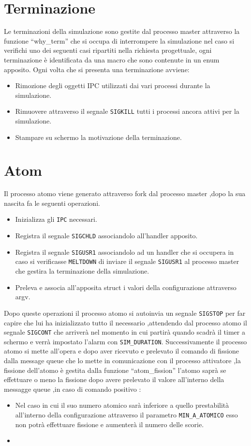 \section{Terminazione} 
Le terminazioni della simulazione sono gestite dal processo master attraverso la funzione \enquote{why\_term} che si occupa di interrompere la simulazione nel caso si verifichi uno dei seguenti casi  ripartiti nella richiesta progettuale, ogni terminazione è identificata da una macro che sono contenute in un enum apposito. 
Ogni volta che si presenta una terminazione avviene:
\begin{itemize}
    \item Rimozione degli oggetti IPC utilizzati dai vari processi durante la simulazione. 
    \item Rimuovere attraverso il segnale \texttt{SIGKILL} tutti i processi ancora attivi per la simulazione. 
    \item Stampare su schermo la motivazione della terminazione. 
\end{itemize}
\section{Atom}

Il processo atomo viene generato attraverso fork dal processo master ,dopo la sua nascita fa le seguenti operazioni.
    \begin{itemize}
        \item Inizializza gli \texttt{IPC} necessari.
        \item Registra il segnale \texttt{SIGCHLD} associandolo all'handler apposito. 
        \item Registra il segnale \texttt{SIGUSR1} associandolo ad un handler che si occupera in caso si verificasse \texttt{MELTDOWN} di inviare il segnale \texttt{SIGUSR1} al processo master che gestira la terminazione della simulazione. 
        \item Preleva e associa all'apposita struct i valori della configurazione attraverso argv. 
    \end{itemize}
Dopo queste operazioni il processo atomo si autoinvia un segnale \texttt{SIGSTOP} per far capire che lui ha inizializzato tutto il necessario ,attendendo dal processo atomo il segnale \texttt{SIGCONT} che arriverà nel momento in cui partirà quando scadrà il timer a schermo e verrà impostato l'alarm con \texttt{SIM\_DURATION}.
Successivamente il processo atomo si mette all'opera e dopo aver ricevuto e prelevato il comando di fissione dalla message queue che lo mette in comunicazione con il processo attivatore ,la fissione dell'atomo è gestita dalla funzione \enquote{atom\_fission} l'atomo saprà se effettuare o meno la fissione dopo avere prelevato il valore all'interno della messagge queue ,in caso di comando positivo : 
\begin{itemize}
    \item Nel caso in cui il suo numero atomico sarà inferiore a quello prestabilità all'interno della configurazione attraverso il parametro \texttt{MIN\_A\_ATOMICO} esso non potrà effettuare fissione e aumenterà il numero delle scorie.
    \item 
\end{itemize}

